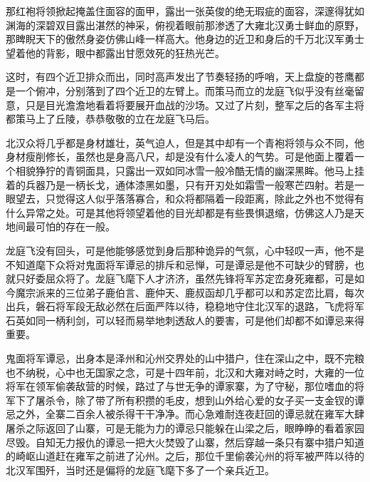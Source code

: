 那红袍将领掀起掩盖住面容的面甲，露出一张英俊的绝无瑕疵的面容，深邃得犹如渊海的深碧双目露出湛然的神采，俯视着眼前那渗透了大雍北汉勇士鲜血的原野，那睥睨天下的傲然身姿仿佛山峰一样高大。他身边的近卫和身后的千万北汉军勇士望着他的背影，眼中都露出甘愿效死的狂热光芒。

这时，有四个近卫排众而出，同时高声发出了节奏轻扬的呼哨，天上盘旋的苍鹰都是一个俯冲，分别落到了四个近卫的左臂上。而策马而立的龙庭飞似乎没有丝毫留意，只是目光澹澹地看着将要展开血战的沙场。又过了片刻，整军之后的各军主将都策马上了丘陵，恭恭敬敬的立在龙庭飞马后。

北汉众将几乎都是身材雄壮，英气迫人，但是其中却有一个青袍将领与众不同，他身材瘦削修长，虽然也是身高八尺，却是没有什么凌人的气势。可是他面上覆着一个相貌狰狞的青铜面具，只露出一双如同冰雪一般冷酷无情的幽深黑眸。他马上挂着的兵器乃是一柄长戈，通体漆黑如墨，只有开刃处如霜雪一般寒芒四射。若是一眼望去，只觉得这人似乎落落寡合，和众将都隔着一段距离，除此之外也不觉得有什么异常之处。可是其他将领望着他的目光却都是有些畏惧退缩，仿佛这人乃是天地间最可怕的存在一般。

龙庭飞没有回头，可是他能够感觉到身后那种诡异的气氛，心中轻叹一声，他不是不知道麾下众将对鬼面将军谭忌的排斥和忌惮，可是谭忌是他不可缺少的臂膀，也就只好委屈众将了。龙庭飞麾下人才济济，虽然先锋将军苏定峦身死雍都，可是如今魔宗派来的三位弟子鹿伯言、鹿仲天、鹿叔函却几乎都可以和苏定峦比肩，每次出兵，磐石将军段无敌必然在后面严阵以待，稳稳地守住北汉军的退路，飞虎将军石英如同一柄利剑，可以轻而易举地刺透敌人的要害，可是他们却都不如谭忌来得重要。

鬼面将军谭忌，出身本是泽州和沁州交界处的山中猎户，住在深山之中，既不完粮也不纳税，心中也无国家之念，可是十四年前，北汉和大雍对峙之时，大雍的一位将军在领军偷袭敌营的时候，路过了与世无争的谭家寨，为了守秘，那位嗜血的将军下了屠杀令，除了带了所有积攒的毛皮，想到山外给心爱的女子买一支金钗的谭忌之外，全寨二百余人被杀得干干净净。而心急难耐连夜赶回的谭忌就在雍军大肆屠杀之际返回了山寨，可是无能为力的谭忌只能躲在山梁之后，眼睁睁的看着家园尽毁。自知无力报仇的谭忌一把大火焚毁了山寨，然后穿越一条只有寨中猎户知道的崎岖山道赶在雍军之前进了沁州。之后，那位千里偷袭沁州的将军被严阵以待的北汉军围歼，当时还是偏将的龙庭飞麾下多了一个亲兵近卫。

